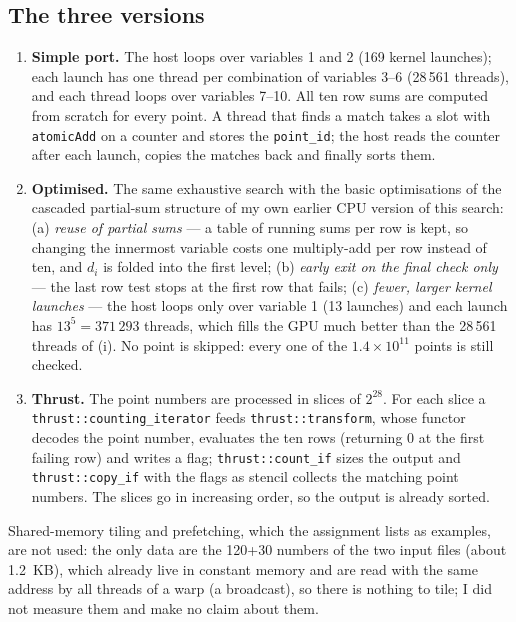 \documentclass[11pt]{article}
\begin{document}
\subsection*{The three versions}
\begin{enumerate}
\item[\textbf{(i)}] \textbf{Simple port.} The host loops over variables 1 and
 2 (169 kernel launches); each launch has one thread per combination of
 variables 3--6 (28\,561 threads), and each thread loops over variables 7--10.
 All ten row sums are computed from scratch for every point. A thread that
 finds a match takes a slot with \texttt{atomicAdd} on a counter and stores
 the \texttt{point\_id}; the host reads the counter after each launch, copies
 the matches back and finally sorts them.
\item[\textbf{(ii)}] \textbf{Optimised.} The same exhaustive search with the
 basic optimisations of the cascaded partial-sum structure of my own earlier
 CPU version of this search: (a) \emph{reuse of partial sums} --- a table of running sums per row is
 kept, so changing the innermost variable costs one multiply-add per row
 instead of ten, and $d_i$ is folded into the first level; (b) \emph{early exit
 on the final check only} --- the last row test stops at the first row that
 fails; (c) \emph{fewer, larger kernel launches} --- the host loops only over
 variable 1 (13 launches) and each launch has $13^5=371\,293$ threads, which
 fills the GPU much better than the 28\,561 threads of (i). No point is
 skipped: every one of the $1.4\times10^{11}$ points is still checked.
\item[\textbf{(iii)}] \textbf{Thrust.} The point numbers are processed in
 slices of $2^{28}$. For each slice a \texttt{thrust::\allowbreak counting\_iterator} feeds
 \texttt{thrust::\allowbreak transform}, whose functor decodes the point number, evaluates
 the ten rows (returning 0 at the first failing row) and writes a flag;
 \texttt{thrust::\allowbreak count\_if} sizes the output and \texttt{thrust::\allowbreak copy\_if}
 with the flags as stencil collects the matching point numbers. The slices go
 in increasing order, so the output is already sorted.
\end{enumerate}
Shared-memory tiling and prefetching, which the assignment lists as examples,
are not used: the only data are the 120+30 numbers of the two input files
(about 1.2~KB), which already live in constant memory and are read with the
same address by all threads of a warp (a broadcast), so there is nothing to
tile; I did not measure them and make no claim about them.
\end{document}
